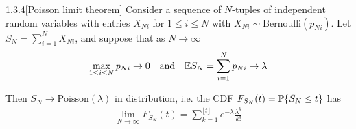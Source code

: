 \begin{thm}{1.3.4}[Poisson limit theorem] \label{1.3.4}
Consider a sequence of $N$-tuples of independent random variables with entries $X_{Ni}$ for $1 \leq i \leq N$ with $X_{Ni} \sim \text{Bernoulli}(p_{Ni})$. Let $S_N = \sum_{i=1}^N X_{Ni}$, and suppose that as $N\to\infty$
\begin{align*}
    \max_{1 \leq i \leq N} p_{Ni} \to 0 \quad\text{and}\quad \E S_N = \sum_{i=1}^N p_{Ni}\to \lambda
\end{align*}

Then $S_N \to \text{Poisson}(\lambda)$ in distribution, i.e. the CDF $F_{S_N}(t) = \P \{S_N \leq t\}$ has
\begin{align*}
    \lim_{N\to\infty} F_{S_N}(t) = \sum_{k=1}^{\lfloor t \rfloor} e^{-\lambda} \frac {\lambda^k} {k!}
\end{align*}
\end{thm}